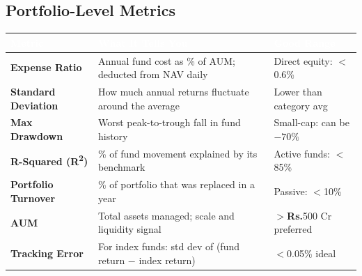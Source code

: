 \documentclass[11pt,a4paper]{article}
\newcommand{\rupee}{\textbf{\textsf{Rs.}}}
\begin{document}
\vspace{5pt}
\subsection{Portfolio-Level Metrics}

\begin{tabularx}{\linewidth}{|>{\bfseries\small\sffamily}p{3.5cm}|X|>{\centering\arraybackslash}p{3.2cm}|}
\hline
\rowcolor{primary!90}
\textcolor{white}{\small Metric} & \textcolor{white}{\small What It Tells You} & \textcolor{white}{\small Good Range} \\
\hline
\rowcolor{lightbg}
Expense Ratio & Annual fund cost as \% of AUM; deducted from NAV daily & \textcolor{positive}{Direct equity: $<$0.6\%} \\
\hline
Standard Deviation & How much annual returns fluctuate around the average & Lower than category avg \\
\hline
\rowcolor{lightbg}
Max Drawdown & Worst peak-to-trough fall in fund history & \textcolor{negative}{Small-cap: can be $-70\%$} \\
\hline
R-Squared (R\textsuperscript{2}) & \% of fund movement explained by its benchmark & Active funds: $<$85\% \\
\hline
\rowcolor{lightbg}
Portfolio Turnover & \% of portfolio that was replaced in a year & Passive: $<$10\% \\
\hline
AUM & Total assets managed; scale and liquidity signal & $>$\rupee{}500 Cr preferred \\
\hline
\rowcolor{lightbg}
Tracking Error & For index funds: std dev of (fund return $-$ index return) & $<$0.05\% ideal \\
\hline
\end{tabularx}
\end{document}
